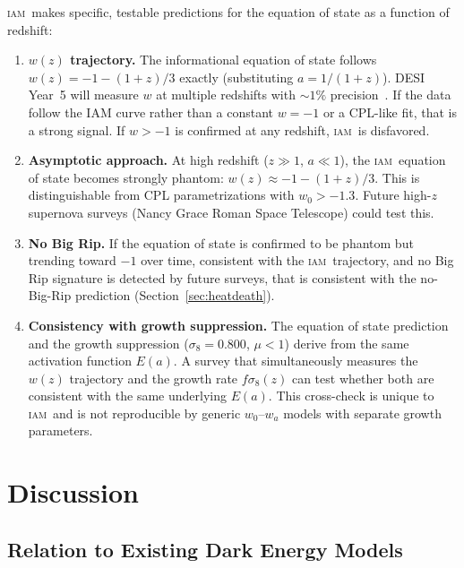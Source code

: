 \documentclass[12pt,letterpaper]{article}
\newcommand{\IAM}{\textsc{iam}}
\newcommand{\Ea}{E(a)}
\begin{document}
\IAM\ makes specific, testable predictions for the equation of state as a function of redshift:

\begin{enumerate}
    \item \textbf{$w(z)$ trajectory.} The informational equation of state follows $w(z) = -1 - (1+z)/3$ exactly (substituting $a = 1/(1+z)$). DESI Year~5 will measure $w$ at multiple redshifts with $\sim 1\%$ precision~\citep{DESI2016}. If the data follow the IAM curve rather than a constant $w = -1$ or a CPL-like fit, that is a strong signal. If $w > -1$ is confirmed at any redshift, \IAM\ is disfavored.

    \item \textbf{Asymptotic approach.} At high redshift ($z \gg 1$, $a \ll 1$), the \IAM\ equation of state becomes strongly phantom: $w(z) \approx -1 - (1+z)/3$. This is distinguishable from CPL parametrizations with $w_0 > -1.3$. Future high-$z$ supernova surveys (Nancy Grace Roman Space Telescope) could test this.

    \item \textbf{No Big Rip.} If the equation of state is confirmed to be phantom but trending toward $-1$ over time, consistent with the \IAM\ trajectory, and no Big Rip signature is detected by future surveys, that is consistent with the no-Big-Rip prediction (Section~\ref{sec:heatdeath}).

    \item \textbf{Consistency with growth suppression.} The equation of state prediction and the growth suppression ($\sigma_8 = 0.800$, $\mu < 1$) derive from the same activation function $\Ea$. A survey that simultaneously measures the $w(z)$ trajectory and the growth rate $f\sigma_8(z)$ can test whether both are consistent with the same underlying $\Ea$. This cross-check is unique to \IAM\ and is not reproducible by generic $w_0$--$w_a$ models with separate growth parameters.
\end{enumerate}

\section{Discussion}

\subsection{Relation to Existing Dark Energy Models}
\end{document}

